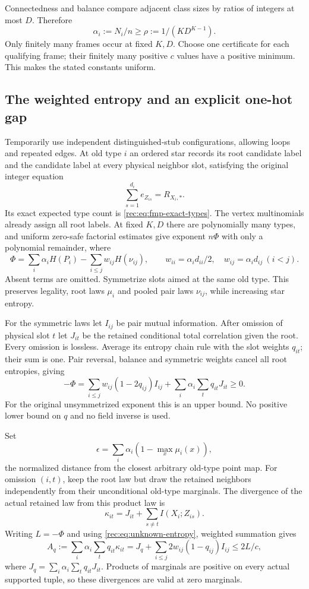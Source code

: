 \documentclass[11pt]{article}
\theoremstyle{definition}
\theoremstyle{remark}
\newcommand{\1}{\mathbf 1}
\begin{document}
Connectedness and balance compare adjacent class sizes by ratios of
integers at most $D$. Therefore
\begin{equation}\label{rec:eq:unknown-rho}
 \alpha_i:=N_i/n\ge\rho:=1/(KD^{K-1}).
\end{equation}
Only finitely many frames occur at fixed $K,D$. Choose one certificate
for each qualifying frame; their finitely many positive $c$ values
have a positive minimum. This makes the stated constants uniform.

\subsection{The weighted entropy and an explicit one-hot gap}
Temporarily use independent distinguished-stub configurations, allowing
loops and repeated edges. At old type $i$ an ordered star records
its root candidate label and the candidate label at every physical
neighbor slot, satisfying the original integer equation
\[
 \sum_{s=1}^{d_i}e_{Z_{is}}=R_{X_i,*}.
\]
Its exact expected type count is \eqref{rec:eq:fmp-exact-types}.
The vertex multinomials already assign all root labels.
At fixed $K,D$ there are polynomially many types, and uniform
zero-safe factorial estimates give exponent $n\Phi$ with only a
polynomial remainder, where
\[
 \Phi=\sum_i\alpha_iH(P_i)-\sum_{i\le j}w_{ij}H(\nu_{ij}),\qquad
 w_{ii}=\alpha_id_{ii}/2,\quad w_{ij}=\alpha_id_{ij}\ (i<j).
\]
Absent terms are omitted. Symmetrize slots aimed at the same old
type. This preserves legality, root laws $\mu_i$ and pooled pair
laws $\nu_{ij}$, while increasing star entropy.

For the symmetric laws let $I_{ij}$ be pair mutual information.
After omission of physical slot $t$ let $J_{it}$ be the retained
conditional total correlation given the root. Every omission is
lossless. Average its entropy chain rule with the slot weights
$q_{it}$; their sum is one. Pair reversal, balance and symmetric
weights cancel all root entropies, giving
\begin{equation}\label{rec:eq:unknown-entropy}
 -\Phi=\sum_{i\le j}w_{ij}(1-2q_{ij})I_{ij}
             +\sum_i\alpha_i\sum_tq_{it}J_{it}\ge0.
\end{equation}
For the original unsymmetrized exponent this is an upper bound.
No positive lower bound on $q$ and no field inverse is used.

Set
\[
 \epsilon=\sum_i\alpha_i(1-\max_x\mu_i(x)),
\]
the normalized distance from the closest arbitrary old-type point map.
For omission $(i,t)$, keep the root law but draw the retained neighbors
independently from their unconditional old-type marginals. The
divergence of the actual retained law from this product law is
\[
 \kappa_{it}=J_{it}+\sum_{s\ne t}I(X_i;Z_{is}).
\]
Writing $L=-\Phi$ and using \eqref{rec:eq:unknown-entropy}, weighted
summation gives
\begin{equation}\label{rec:eq:unknown-KL}
 A_q:=\sum_i\alpha_i\sum_tq_{it}\kappa_{it}
 =J_q+\sum_{i\le j}2w_{ij}(1-q_{ij})I_{ij}\le2L/c,
\end{equation}
where $J_q=\sum_i\alpha_i\sum_tq_{it}J_{it}$.
Products of marginals are positive on every actual supported tuple,
so these divergences are valid at zero marginals.
\end{document}
